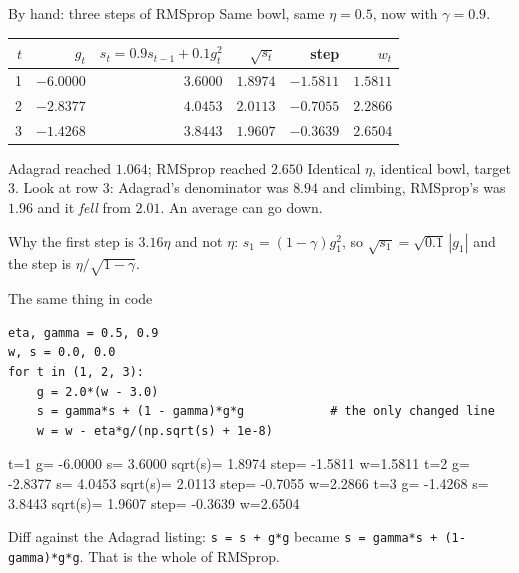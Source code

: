 \documentclass[aspectratio=169]{beamer}
\begin{document}
\begin{frame}[shrink=8]{By hand: three steps of RMSprop}
  Same bowl, same $\eta = 0.5$, now with $\gamma = 0.9$.
  \begin{center}\small
  \begin{tabular}{@{}rrrrrr@{}}
    \toprule
    $t$ & $g_t$ & $s_t = 0.9 s_{t-1}+0.1 g_t^2$ & $\sqrt{s_t}$
        & step & $w_t$\\
    \midrule
    1 & $-6.0000$ & $3.6000$ & $1.8974$ & $-1.5811$ & $1.5811$\\
    2 & $-2.8377$ & $4.0453$ & $2.0113$ & $-0.7055$ & $2.2866$\\
    3 & $-1.4268$ & $3.8443$ & $1.9607$ & $-0.3639$ & $2.6504$\\
    \bottomrule
  \end{tabular}
  \end{center}
  \vspace{0.2em}
  \begin{alertblock}{Adagrad reached $1.064$; RMSprop reached $2.650$}
    \small Identical $\eta$, identical bowl, target $3$. Look at row 3: Adagrad's
    denominator was $8.94$ and climbing, RMSprop's was $1.96$ and it \emph{fell}
    from $2.01$. An average can go down.
  \end{alertblock}
  \vspace{0.2em}
  \begin{center}\small
    Why the first step is $3.16\eta$ and not $\eta$: $s_1 = (1-\gamma)g_1^2$, so
    $\sqrt{s_1} = \sqrt{0.1}\,|g_1|$ and the step is $\eta/\sqrt{1-\gamma}$.
  \end{center}
\end{frame}

\begin{frame}[fragile]{The same thing in code}
\begin{lstlisting}
eta, gamma = 0.5, 0.9
w, s = 0.0, 0.0
for t in (1, 2, 3):
    g = 2.0*(w - 3.0)
    s = gamma*s + (1 - gamma)*g*g            # the only changed line
    w = w - eta*g/(np.sqrt(s) + 1e-8)
\end{lstlisting}
\begin{outblk}
t=1  g= -6.0000  s=  3.6000  sqrt(s)= 1.8974  step= -1.5811  w=1.5811
t=2  g= -2.8377  s=  4.0453  sqrt(s)= 2.0113  step= -0.7055  w=2.2866
t=3  g= -1.4268  s=  3.8443  sqrt(s)= 1.9607  step= -0.3639  w=2.6504
\end{outblk}
\begin{center}\small
  Diff against the Adagrad listing: \texttt{s = s + g*g} became
  \texttt{s = gamma*s + (1-gamma)*g*g}. That is the whole of RMSprop.
\end{center}
\end{frame}
\end{document}
